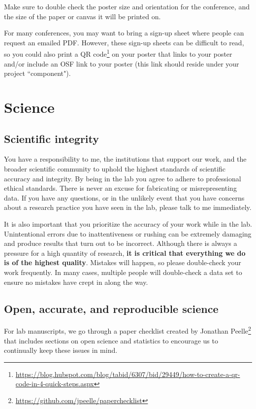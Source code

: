 \documentclass[letterpaper,12pt,oneside]{memoir}
\begin{document}
{Make sure to double check the poster size and orientation for the conference, and the size of the paper or canvas it will be printed on.

For many conferences, you may want to bring a sign-up sheet where people can request an emailed PDF. However, these sign-up sheets can be difficult to read, so you could also print a QR code\footnote{\url{https://blog.hubspot.com/blog/tabid/6307/bid/29449/how-to-create-a-qr-code-in-4-quick-steps.aspx}} on your poster that links to your poster and/or include an OSF link to your poster (this link should reside under your project ``component").



\chapter{Science}

\section{Scientific integrity}

You have a responsibility to me, the institutions that support our work, and the broader scientific community to uphold the highest standards of scientific accuracy and integrity. By being in the lab you agree to adhere to professional ethical standards. There is never an excuse for fabricating or misrepresenting data. If you have any questions, or in the unlikely event that you have concerns about a research practice you have seen in the lab, please talk to me immediately.

It is also important that you prioritize the accuracy of your work while in the lab. Unintentional errors due to inattentiveness or rushing can be extremely damaging and produce results that turn out to be incorrect. Although there is always a pressure for a high quantity of research, \textbf{it is critical that everything we do is of the highest quality}. Mistakes will happen, so please double-check your work frequently. In many cases, multiple people will double-check a data set to ensure no mistakes have crept in along the way.


\section{Open, accurate, and reproducible science}
\label{sec:openscience}

For lab manuscripts, we go through a paper checklist created by Jonathan Peelle\footnote{\url{https://github.com/jpeelle/paperchecklist}} that includes sections on open science and statistics to encourage us to continually keep these issues in mind.


}
\end{document}
